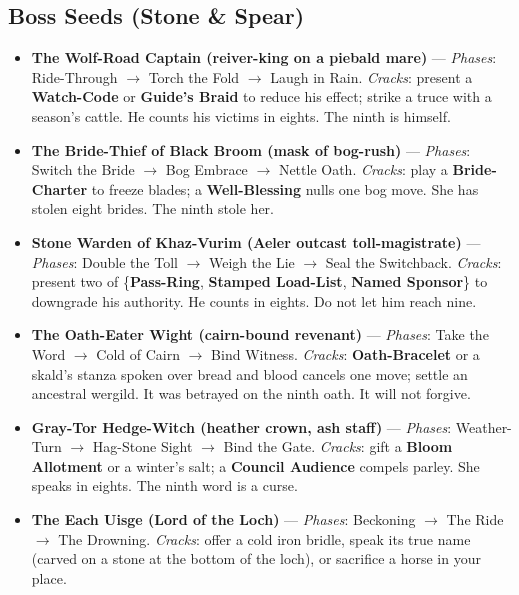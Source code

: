 \subsection*{Boss Seeds (Stone \& Spear)}
\begin{itemize}
\item \textbf{The Wolf-Road Captain (reiver-king on a piebald mare)} --- \emph{Phases}: Ride-Through \(\rightarrow\) Torch the Fold \(\rightarrow\) Laugh in Rain. \emph{Cracks}: present a \textbf{Watch-Code} or \textbf{Guide's Braid} to reduce his effect; strike a truce with a season's cattle. He counts his victims in eights. The ninth is himself.
\item \textbf{The Bride-Thief of Black Broom (mask of bog-rush)} --- \emph{Phases}: Switch the Bride \(\rightarrow\) Bog Embrace \(\rightarrow\) Nettle Oath. \emph{Cracks}: play a \textbf{Bride-Charter} to freeze blades; a \textbf{Well-Blessing} nulls one bog move. She has stolen eight brides. The ninth stole her.
\item \textbf{Stone Warden of Khaz-Vurim (Aeler outcast toll-magistrate)} --- \emph{Phases}: Double the Toll \(\rightarrow\) Weigh the Lie \(\rightarrow\) Seal the Switchback. \emph{Cracks}: present two of \{\textbf{Pass-Ring}, \textbf{Stamped Load-List}, \textbf{Named Sponsor}\} to downgrade his authority. He counts in eights. Do not let him reach nine.
\item \textbf{The Oath-Eater Wight (cairn-bound revenant)} --- \emph{Phases}: Take the Word \(\rightarrow\) Cold of Cairn \(\rightarrow\) Bind Witness. \emph{Cracks}: \textbf{Oath-Bracelet} or a skald's stanza spoken over bread and blood cancels one move; settle an ancestral wergild. It was betrayed on the ninth oath. It will not forgive.
\item \textbf{Gray-Tor Hedge-Witch (heather crown, ash staff)} --- \emph{Phases}: Weather-Turn \(\rightarrow\) Hag-Stone Sight \(\rightarrow\) Bind the Gate. \emph{Cracks}: gift a \textbf{Bloom Allotment} or a winter's salt; a \textbf{Council Audience} compels parley. She speaks in eights. The ninth word is a curse.
\item \textbf{The Each Uisge (Lord of the Loch)} --- \emph{Phases}: Beckoning \(\rightarrow\) The Ride \(\rightarrow\) The Drowning. \emph{Cracks}: offer a cold iron bridle, speak its true name (carved on a stone at the bottom of the loch), or sacrifice a horse in your place.
\end{itemize}

